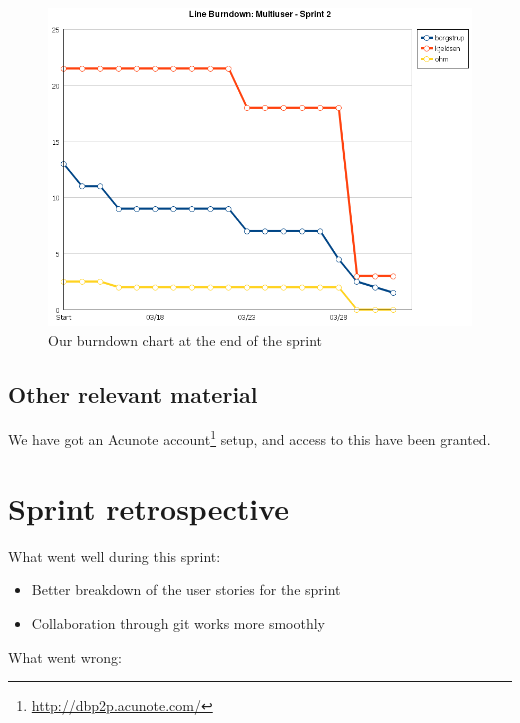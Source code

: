 \documentclass[a4paper,11pt]{article}
\begin{document}
\begin{figure}[ht!]
	\begin{center}
	\includegraphics[width=\textwidth]{burndown.png}		
	\end{center}
	\caption{Our burndown chart at the end of the sprint}
	\label{burndown}
\end{figure}

\subsection{Other relevant material}
We have got an Acunote account\footnote{\url{http://dbp2p.acunote.com/}} setup, and access to this have been granted.

\clearpage


\section{Sprint retrospective}

What went well during this sprint:

\begin{itemize}
	\item Better breakdown of the user stories for the sprint
	\item Collaboration through git works more smoothly
\end{itemize}

\noindent
What went wrong:
\end{document}

